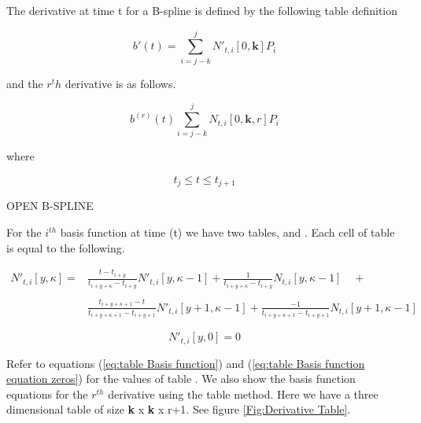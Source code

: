 \documentclass{article}
\begin{document}
The derivative at time t for a B-spline is defined by the following table definition

  \begin{equation} \label{eq:B-Spline derivative equation}
      b'(t) = \sum^{j}_{i=j-k} N'_{t,i}[0,\textbf{k}] P_i
  \end{equation}
  
  and the \(r^th\) derivative is as follows.
  
  \begin{equation} \label{eq:B-Spline rth derivative equation}
      b^{(r)}(t) \sum^{j}_{i=j-k} N_{t,i}[0,\textbf{k},r] P_i
  \end{equation}

where

\begin{equation}
  t_{j} \leq t \le t_{j+1}
\end{equation}

\hspace{1cm}

OPEN B-SPLINE

\hspace{1cm}

For the \(i^{th}\) basis function at time (t) we have two tables,  and . Each cell of table  is equal to the following.

 \begin{equation} \label{eq:Basis function table derivative equation}
 \begin{aligned}
  N'_{t,i}[y,\kappa] = & 
  \frac{t - t_{i+y}}{t_{i+y+\kappa} - t_{i+y}} N'_{t,i}[y,\kappa-1] + \frac{1}{t_{i+y+\kappa} - t_{i+y}} N_{t,i}[y,\kappa-1] \quad + \\\\
   & \frac{t_{i+y+\kappa+1} - t}{t_{i+y+\kappa+1}-t_{i+y+1}} N'_{t,i}[y+1 , \kappa-1] +  \frac{-1}{t_{i+y+\kappa+1}-t_{i+y+1}} N_{t,i}[y+1 , \kappa-1]
 \end{aligned}
  \end{equation}
  
\hspace{1cm}
  
  \begin{equation}
      N'_{t,i}[y,0] = 0
  \end{equation}
  
Refer to equations (\ref{eq:table Basis function}) and (\ref{eq:table Basis function equation zeros}) for the values of table . We also show the basis function equations for the \(r^{th}\) derivative using the table method. Here we have a three dimensional table of size \textbf{k} x \textbf{k} x r+1. See figure \ref{Fig:Derivative Table}.
\end{document}
